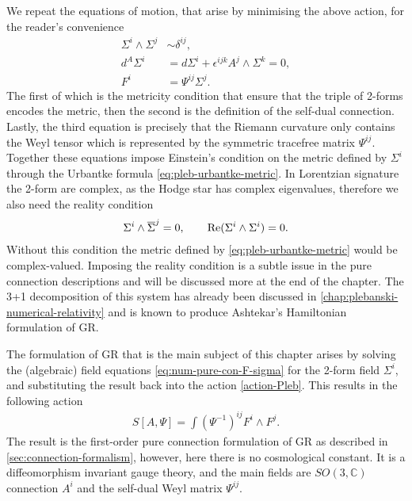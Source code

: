 \documentclass[10pt]{report}
\newcommand{\urb}[0]{Urbantke}
\theoremstyle{definition}
\newcommand{\C}[0]{\mathbb{C}}
\newcommand{\asd}[0]{\overline{\Sigma}}
\begin{document}
We repeat the equations of motion, that arise by minimising the above action, for the reader's convenience
\begin{align}
    \Sigma^i\wedge \Sigma^j & \sim \delta^{ij}, \label{eq:num-pure-con-metricity}\\
    d^A \Sigma^i & = d\Sigma^i + \epsilon^{ijk} A^j \wedge \Sigma^k=0, \\
    F^i & = \Psi^{ij} \Sigma^j. \label{eq:num-pure-con-F-sigma}
\end{align}
The first of which is the metricity condition that ensure that the triple of 2-forms encodes the metric, then the second is the definition of the self-dual connection. Lastly, the third equation is precisely that the Riemann curvature only contains the Weyl tensor which is represented by the symmetric tracefree matrix $\Psi^{ij}$. Together these equations impose Einstein's condition on the metric defined by $\Sigma^i$ through the \urb{} formula \cref{eq:pleb-urbantke-metric}. In Lorentzian signature the 2-form are complex, as the Hodge star has complex eigenvalues, therefore we also need the reality condition 
\begin{align}
    \Sigma^i \wedge \asd^j = 0, \qquad {\rm Re}(\Sigma^i \wedge \Sigma^i) = 0. \label{eq:num-pure-con-reality-conditions}
\end{align}
Without this condition the metric defined by \cref{eq:pleb-urbantke-metric} would be complex-valued. Imposing the reality condition is a subtle issue in the pure connection descriptions and will be discussed more at the end of the chapter. The 3+1 decomposition of this system has already been discussed in \cref{chap:plebanski-numerical-relativity} and is known to produce Ashtekar's Hamiltonian formulation of GR.

The formulation of GR that is the main subject of this chapter arises by solving the (algebraic) field equations \cref{eq:num-pure-con-F-sigma} for the 2-form field $\Sigma^i$, and substituting the result back into the action \cref{action-Pleb}. This results in the following action
\begin{align}\label{eq:num-pure-con-action}
S[A,\Psi] = \int \left(\Psi^{-1}\right)^{ij} F^i \wedge F^j.
\end{align}
The result is the first-order pure connection formulation of GR as described in \cref{sec:connection-formalism}, however, here there is no cosmological constant. It is a diffeomorphism invariant gauge theory, and the main fields are $SO(3,\C)$ connection $A^i$ and the self-dual Weyl matrix $\Psi^{ij}$.
\end{document}

